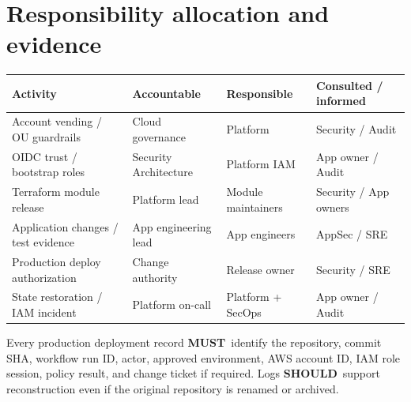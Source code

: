 \documentclass[10pt,letterpaper]{article}
\newcommand{\must}{\textbf{MUST}}
\newcommand{\should}{\textbf{SHOULD}}
\begin{document}
\section{Responsibility allocation and evidence}
\begin{center}\small\begin{tabularx}{\linewidth}{@{}>{\raggedright\arraybackslash}p{47mm}>{\raggedright\arraybackslash}p{29mm}>{\raggedright\arraybackslash}p{30mm}>{\raggedright\arraybackslash}X@{}}\toprule
Activity & Accountable & Responsible & Consulted / informed\\\midrule
Account vending / OU guardrails & Cloud governance & Platform & Security / Audit\\
OIDC trust / bootstrap roles & Security Architecture & Platform IAM & App owner / Audit\\
Terraform module release & Platform lead & Module maintainers & Security / App owners\\
Application changes / test evidence & App engineering lead & App engineers & AppSec / SRE\\
Production deploy authorization & Change authority & Release owner & Security / SRE\\
State restoration / IAM incident & Platform on-call & Platform + SecOps & App owner / Audit\\\bottomrule\end{tabularx}\end{center}
Every production deployment record \must\ identify the repository, commit SHA, workflow run ID, actor, approved environment, AWS account ID, IAM role session, policy result, and change ticket if required. Logs \should\ support reconstruction even if the original repository is renamed or archived.
\end{document}

